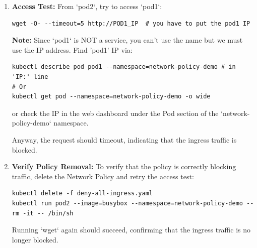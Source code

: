 \documentclass{article}
\begin{document}
\begin{enumerate}
    \item \textbf{Access Test:}
    From `pod2`, try to access `pod1`:
    \begin{lstlisting}
wget -O- --timeout=5 http://POD1_IP  # you have to put the pod1 IP
    \end{lstlisting}
    \textbf{Note:} Since `pod1` is NOT a service, you can't use the name but we must use the IP address. Find 'pod1' IP via:
    \begin{lstlisting}
kubectl describe pod pod1 --namespace=network-policy-demo # in 'IP:' line
# Or
kubectl get pod --namespace=network-policy-demo -o wide
    \end{lstlisting}
    or check the IP in the web dashboard under the Pod section of the `network-policy-demo` namespace.

    Anyway, the request should timeout, indicating that the ingress traffic is blocked.

    \item \textbf{Verify Policy Removal:}
    To verify that the policy is correctly blocking traffic, delete the Network Policy and retry the access test:
    \begin{lstlisting}
kubectl delete -f deny-all-ingress.yaml
kubectl run pod2 --image=busybox --namespace=network-policy-demo --rm -it -- /bin/sh
    \end{lstlisting}
    Running `wget` again should succeed, confirming that the ingress traffic is no longer blocked.
\end{enumerate}
\end{document}
